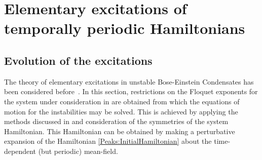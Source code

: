 \chapter{Elementary excitations of temporally periodic Hamiltonians}
\label{FloquetAppendix}
\graphicspath{{Figures/FloquetAppendix/}{Figures/Common/}}

\section{Evolution of the excitations}
\label{FloquetAppendix:Evolution}
The theory of elementary excitations in unstable Bose-Einstein Condensates has been considered before~\citep{Leonhardt:2003}.  In this section, restrictions on the Floquet exponents for the system under consideration in  are obtained from which the equations of motion for the instabilities may be solved.  This is achieved by applying the methods discussed in \citep{Leonhardt:2003} and consideration of the symmetries of the system Hamiltonian.  This Hamiltonian can be obtained by making a perturbative expansion of the Hamiltonian \eqref{Peaks:InitialHamiltonian} about the time-dependent (but periodic) mean-field.

